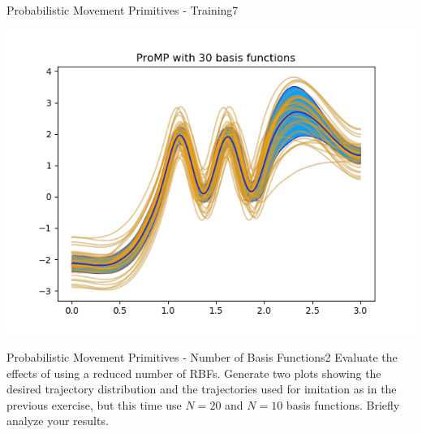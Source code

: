 \begin{questions}
\begin{question}[bonus]{Probabilistic Movement Primitives - Training}{7}
\begin{answer}
\begin{center}
	\includegraphics[width=.7\linewidth]{img/2g.png}
\end{center}



\end{answer}

\end{question}


\begin{question}[bonus]{Probabilistic Movement Primitives - Number of Basis Functions}{2}
Evaluate the effects of using a reduced number of RBFs. Generate two plots showing the desired trajectory distribution and the trajectories used for imitation as in the previous exercise, but this time use $N=20$ and $N=10$ basis functions. Briefly analyze your results.


\end{question}
\end{questions}
